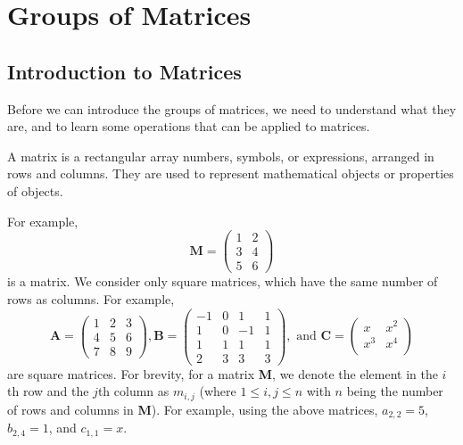 \section{Groups of Matrices}
\subsection{Introduction to Matrices}
Before we can introduce the groups of matrices, we need to understand what they are, and to learn some operations that can be applied to matrices.

A matrix is a rectangular array numbers, symbols, or expressions, arranged in rows and columns. They are used to represent mathematical objects or properties of objects.

For example,
\[
    \textbf{M} = \begin{pmatrix}
    1 & 2\\
    3 & 4\\
    5 & 6
    \end{pmatrix}
\]
is a matrix. We consider only square matrices, which have the same number of rows as columns. For example,
\[
    \textbf{A} = \begin{pmatrix}
    1 & 2 & 3\\
    4 & 5 & 6\\
    7 & 8 & 9
    \end{pmatrix}, \textbf{B} = \begin{pmatrix}
    -1 & 0 & 1 & 1\\
    1 & 0 & -1 & 1\\
    1 & 1 & 1 & 1\\
    2 & 3 & 3 & 3
    \end{pmatrix}, \textrm{ and } \textbf{C} = \begin{pmatrix}
    x & x^2\\
    x^3 & x^4\\
    \end{pmatrix}
\]
are square matrices. For brevity, for a matrix \textbf{M}, we denote the element in the $i$th row and the $j$th column as $m_{i,j}$ (where $1 \leq i, j \leq n$ with $n$ being the number of rows and columns in \textbf{M}). For example, using the above matrices, $a_{2,2} = 5$, $b_{2,4}=1$, and $c_{1,1} = x$.

